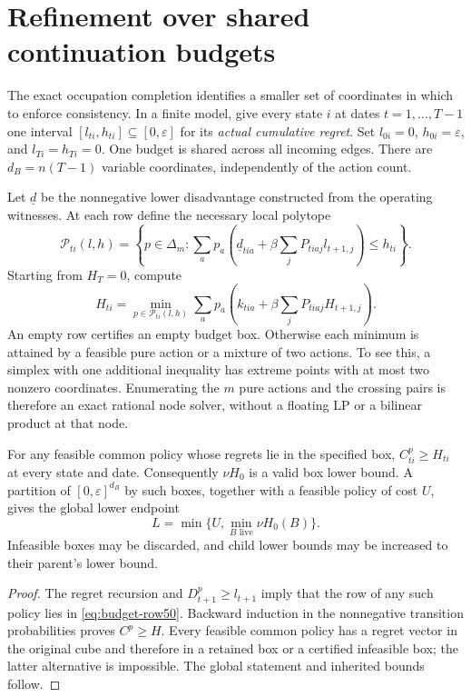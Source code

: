 \section{Refinement over shared continuation budgets}\label{sec:budget50}
The exact occupation completion identifies a smaller set of coordinates in which to enforce consistency. In a finite model, give every state $i$ at dates $t=1,\ldots,T-1$ one interval $[l_{ti},h_{ti}]\subseteq[0,\varepsilon]$ for its \emph{actual cumulative regret}. Set $l_{0i}=0$, $h_{0i}=\varepsilon$, and $l_{Ti}=h_{Ti}=0$. One budget is shared across all incoming edges. There are $d_B=n(T-1)$ variable coordinates, independently of the action count.

Let $\underline d$ be the nonnegative lower disadvantage constructed from the operating witnesses. At each row define the necessary local polytope
\begin{equation}\label{eq:budget-row50}
 \mathcal P_{ti}(l,h)=\left\{p\in\Delta_m:
 \sum_a p_a\left(\underline d_{tia}+\beta\sum_jP_{tiaj}l_{t+1,j}\right)\le h_{ti}\right\}.
\end{equation}
Starting from $H_T=0$, compute
\begin{equation}\label{eq:budget-bellman50}
 H_{ti}=\min_{p\in\mathcal P_{ti}(l,h)}
 \sum_a p_a\left(k_{tia}+\beta\sum_jP_{tiaj}H_{t+1,j}\right).
\end{equation}
An empty row certifies an empty budget box. Otherwise each minimum is attained by a feasible pure action or a mixture of two actions. To see this, a simplex with one additional inequality has extreme points with at most two nonzero coordinates. Enumerating the $m$ pure actions and the crossing pairs is therefore an exact rational node solver, without a floating LP or a bilinear product at that node.

\begin{proposition}\label{prop:budget-lower50}
For any feasible common policy whose regrets lie in the specified box, $C^p_{ti}\ge H_{ti}$ at every state and date. Consequently $\nu H_0$ is a valid box lower bound. A partition of $[0,\varepsilon]^{d_B}$ by such boxes, together with a feasible policy of cost $U$, gives the global lower endpoint
\[
 L=\min\{U,\min_{B\text{ live}}\nu H_0(B)\}.
\]
Infeasible boxes may be discarded, and child lower bounds may be increased to their parent's lower bound.
\end{proposition}
\begin{proof}
The regret recursion and $D^p_{t+1}\ge l_{t+1}$ imply that the row of any such policy lies in \eqref{eq:budget-row50}. Backward induction in the nonnegative transition probabilities proves $C^p\ge H$. Every feasible common policy has a regret vector in the original cube and therefore in a retained box or a certified infeasible box; the latter alternative is impossible. The global statement and inherited bounds follow.\end{proof}

